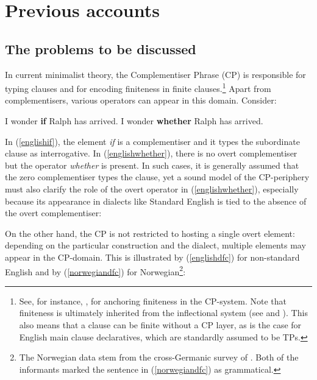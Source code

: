 \section{Previous accounts} \label{sec:2previous}
\subsection{The problems to be discussed} \label{sec:2problems}
In current minimalist theory, the Complementiser Phrase (CP) is responsible for typing clauses and for encoding finiteness in finite clauses.\footnote{See, for instance, \citet[283]{rizzi1997}, for anchoring finiteness in the CP-system. Note that finiteness is ultimately inherited from the inflectional system (see \citealt{chomskylasnik1977} and \citealt{denbesten1983}). This also means that a clause can be finite without a CP layer, as is the case for English main clause declaratives, which are standardly assumed to be TPs.} Apart from complementisers, various operators can appear in this domain. Consider:

\ea
\ea I wonder \textbf{if} Ralph has arrived. \label{englishif}
\ex I wonder \textbf{whether} Ralph has arrived. \label{englishwhether}
\z
\z

In (\ref{englishif}), the element \textit{if} is a complementiser and it types the subordinate clause as interrogative. In (\ref{englishwhether}), there is no overt complementiser but the operator \textit{wheth\-er} is present. In such cases, it is generally assumed that the zero complementiser types the clause, yet a sound model of the CP-periphery must also clarify the role of the overt operator in (\ref{englishwhether}), especially because its appearance in dialects like Standard English is tied to the absence of the overt complementiser:

\z

On the other hand, the CP is not restricted to hosting a single overt element: depending on the particular construction and the dialect, multiple elements may appear in the CP-domain. This is illustrated by (\ref{englishdfc}) for non-standard English and by (\ref{norwegiandfc}) for Norwegian\footnote{The Norwegian data stem from the cross-Germanic survey of \citet[175]{bacskaiatkaribaudisch2018}. Both of the informants marked the sentence in (\ref{norwegiandfc}) as grammatical.}:

\ea \label{dfc}
\z
\z

